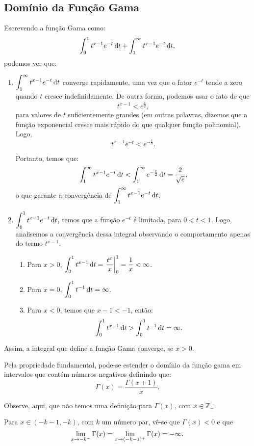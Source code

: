 
\subsection*{Domínio da Função Gama}


Escrevendo a função Gama como:
$$\displaystyle \int_{0}^{1}t^{x-1}e^{-t}\operatorname{d}\!t+\displaystyle \int_{1}^{\infty}t^{x-1}e^{-t}\operatorname{d}\!t,$$
podemos ver que:
\begin{enumerate}
\item $\displaystyle \int_{1}^{\infty}t^{x-1}e^{-t}\operatorname{d}\!t$ converge rapidamente, uma vez que o fator $e^{-t}$ tende a zero quando $t$ cresce indefinidamente. De outra forma, podemos usar o fato de que
$$t^{x-1} < e^{\frac{t}{2}},$$
para valores de $t$ suficientemente grandes (em outras palavras, dizemos que a função exponencial cresce mais rápido do que qualquer função polinomial). Logo, 
$$t^{x-1} e^{-t} < e^{-\frac{t}{2}}.$$

Portanto, temos que:
$$\displaystyle \int_{1}^{\infty} t^{x-1} e^{-t} \operatorname{d}\!t < \displaystyle \int_{1}^{\infty} e^{-\frac{t}{2}} \operatorname{d}\!t = \displaystyle \frac{2}{\sqrt{e}},$$
o que garante a convergência de $\displaystyle \int_{1}^{\infty} t^{x-1} e^{-t} \operatorname{d}\!t$.

\item $\displaystyle \int_{0}^{1}t^{x-1}e^{-t}\operatorname{d}\!t$, temos que a função $e^{-t}$ é limitada, para $0<t<1$. Logo, analisemos a convergência dessa integral observando o comportamento apenas do termo $t^{x-1}$.
\begin{enumerate}
\item Para $x>0$, $\displaystyle \int_{0}^{1} t^{x-1}\operatorname{d}\!t= \left.\displaystyle \frac{t^{x}}{x} \right\vert_{0}^{1} = \displaystyle \frac{1}{x}<{\infty}$.
\item Para $x=0$, $\displaystyle \int_{0}^{1}t^{-1}\operatorname{d}\!t={\infty}$.
\item Para $x<0$, temos que $x-1<-1$, então:
$$\displaystyle \int_{0}^{1}t^{x-1}\operatorname{d}\!t>\displaystyle \int_{0}^{1}t^{-1}\operatorname{d}\!t={\infty}.$$
\end{enumerate}
\end{enumerate}

Assim, a integral que define a função Gama converge, se $x>0$.


Pela propriedade fundamental, pode-se estender o domínio da função gama em intervalos que contém números negativos definindo que:
$$\Gamma(x)=\dfrac{\Gamma(x+1)}{x}.$$

Observe, aqui, que não temos uma definição para $\Gamma(x)$, com $x \in \mathbb{Z}_{-}$.

Para $x \in (-k-1, -k)$, com $k$ um número par, vê-se que $\Gamma(x) < 0$ e que
$$\displaystyle \lim_{x\to -k^{-}} \Gamma(x) = \displaystyle \lim_{x\to (-k-1)^{+}} \Gamma(x) = -\infty.$$

